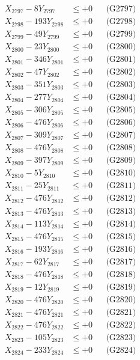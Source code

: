 \documentclass[a4paper,10pt]{article}
\begin{document}
{\begin{align}
X_{2797} - 8Y_{2797} &\leq +0 && \text{(G2797)} \\
X_{2798} - 193Y_{2798} &\leq +0 && \text{(G2798)} \\
X_{2799} - 49Y_{2799} &\leq +0 && \text{(G2799)} \\
X_{2800} - 23Y_{2800} &\leq +0 && \text{(G2800)} \\
\allowbreak
X_{2801} - 346Y_{2801} &\leq +0 && \text{(G2801)} \\
X_{2802} - 47Y_{2802} &\leq +0 && \text{(G2802)} \\
X_{2803} - 351Y_{2803} &\leq +0 && \text{(G2803)} \\
X_{2804} - 277Y_{2804} &\leq +0 && \text{(G2804)} \\
X_{2805} - 306Y_{2805} &\leq +0 && \text{(G2805)} \\
X_{2806} - 476Y_{2806} &\leq +0 && \text{(G2806)} \\
X_{2807} - 309Y_{2807} &\leq +0 && \text{(G2807)} \\
X_{2808} - 476Y_{2808} &\leq +0 && \text{(G2808)} \\
X_{2809} - 397Y_{2809} &\leq +0 && \text{(G2809)} \\
X_{2810} - 5Y_{2810} &\leq +0 && \text{(G2810)} \\
\allowbreak
X_{2811} - 25Y_{2811} &\leq +0 && \text{(G2811)} \\
X_{2812} - 476Y_{2812} &\leq +0 && \text{(G2812)} \\
X_{2813} - 476Y_{2813} &\leq +0 && \text{(G2813)} \\
X_{2814} - 113Y_{2814} &\leq +0 && \text{(G2814)} \\
X_{2815} - 476Y_{2815} &\leq +0 && \text{(G2815)} \\
X_{2816} - 193Y_{2816} &\leq +0 && \text{(G2816)} \\
X_{2817} - 62Y_{2817} &\leq +0 && \text{(G2817)} \\
X_{2818} - 476Y_{2818} &\leq +0 && \text{(G2818)} \\
X_{2819} - 12Y_{2819} &\leq +0 && \text{(G2819)} \\
X_{2820} - 476Y_{2820} &\leq +0 && \text{(G2820)} \\
\allowbreak
X_{2821} - 476Y_{2821} &\leq +0 && \text{(G2821)} \\
X_{2822} - 476Y_{2822} &\leq +0 && \text{(G2822)} \\
X_{2823} - 105Y_{2823} &\leq +0 && \text{(G2823)} \\
X_{2824} - 233Y_{2824} &\leq +0 && \text{(G2824)} \\

\end{align}}
\end{document}
